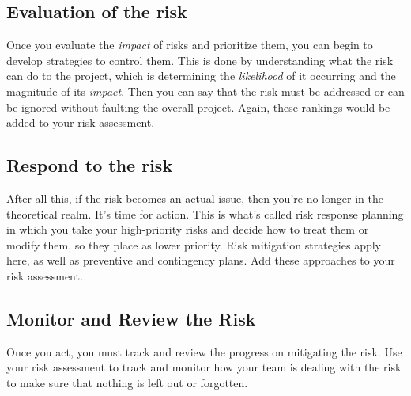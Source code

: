 \documentclass[a4paper,12pt]{article}
\begin{document}
\subsection{Evaluation of the risk}
Once you evaluate the \emph{impact} of risks and prioritize them, you can begin to develop strategies to control them. This is done by understanding what the risk can do to the project, which is determining the \emph{likelihood} of it occurring and the magnitude of its \emph{impact}. Then you can say that the risk must be addressed or can be ignored without faulting the overall project. Again, these rankings would be added to your risk assessment.


\subsection{Respond to the risk}
After all this, if the risk becomes an actual issue, then you’re no longer in the theoretical realm. It’s time for action. This is what’s called risk response planning in which you take your high-priority risks and decide how to treat them or modify them, so they place as lower priority. Risk mitigation strategies apply here, as well as preventive and contingency plans. Add these approaches to your risk assessment.


\subsection{Monitor and Review the Risk}
Once you act, you must track and review the progress on mitigating the risk. Use your risk assessment to track and monitor how your team is dealing with the risk to make sure that nothing is left out or forgotten.


\clearpage

\printindex
\end{document}
